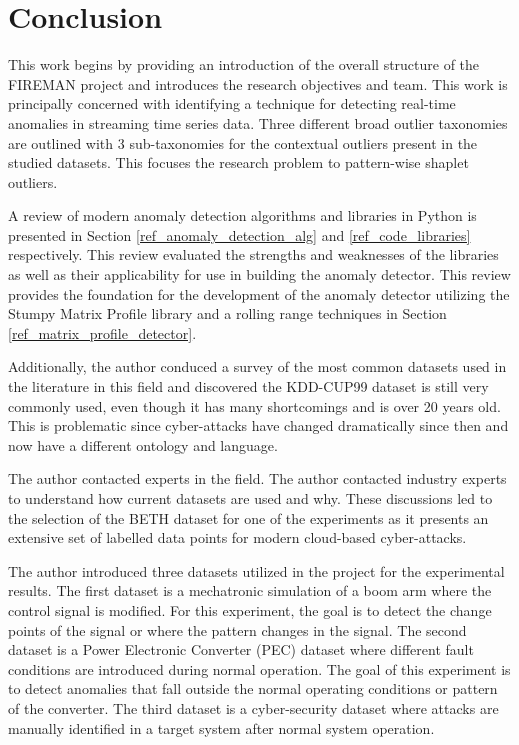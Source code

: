 \section{Conclusion}
\label{sec:conclusion}

This work begins by providing an introduction of the overall structure of the FIREMAN project and introduces the research objectives and team. This work is principally concerned with identifying a technique for detecting real-time anomalies in streaming time series data. Three different broad outlier taxonomies are outlined with 3 sub-taxonomies for the contextual outliers present in the studied datasets. This focuses the research problem to pattern-wise shaplet outliers.

A review of modern anomaly detection algorithms and libraries in Python is presented in Section \ref{ref_anomaly_detection_alg} and \ref{ref_code_libraries} respectively. This review evaluated the strengths and weaknesses of the libraries as well as their applicability for use in building the anomaly detector. This review provides the foundation for the development of the anomaly detector utilizing the Stumpy Matrix Profile library and a rolling range techniques in Section \ref{ref_matrix_profile_detector}. 

Additionally, the author conduced a survey of the most common datasets used in the literature in this field and discovered the KDD-CUP99 dataset is still very commonly used, even though it has many shortcomings and is over 20 years old. This is problematic since cyber-attacks have changed dramatically since then and now have a different ontology and language.

The author contacted experts in the field. The author contacted industry experts to understand how current datasets are used and why. These discussions led to the selection of the BETH dataset for one of the experiments as it presents an extensive set of labelled data points for modern cloud-based cyber-attacks.

The author introduced three datasets utilized in the project for the experimental results. The first dataset is a mechatronic simulation of a boom arm where the control signal is modified. For this experiment, the goal is to detect the change points of the signal or where the pattern changes in the signal. The second dataset is a Power Electronic Converter (PEC) dataset where different fault conditions are introduced during normal operation. The goal of this experiment is to detect anomalies that fall outside the normal operating conditions or pattern of the converter. The third dataset is a cyber-security dataset where attacks are manually identified in a target system after normal system operation.

